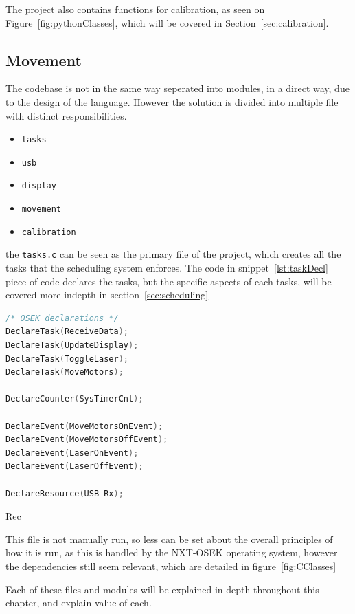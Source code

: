 The project also contains functions for calibration, as seen on Figure~\ref{fig:pythonClasses}, which will be covered in Section~\ref{sec:calibration}.


\subsection{Movement}
The codebase is not in the same way seperated into modules, in a direct way, due to the design of the language. However the solution is divided into multiple file with distinct responsibilities.

\begin{itemize}
	\item \texttt{tasks}
	\item \texttt{usb}
	\item \texttt{display}
	\item \texttt{movement}
	\item \texttt{calibration}
\end{itemize}

the \texttt{tasks.c} can be seen as the primary file of the project, which creates all the tasks that the scheduling system enforces.
The code in snippet~\ref{lst:taskDecl} piece of code declares the tasks, but the specific aspects of each tasks, will be covered more indepth in section~\ref{sec:scheduling}
\begin{lstlisting}[language={c},label={lst:taskDecl},caption={Declaration of tasks, counters and events}]
/* OSEK declarations */
DeclareTask(ReceiveData);
DeclareTask(UpdateDisplay);
DeclareTask(ToggleLaser);
DeclareTask(MoveMotors);

DeclareCounter(SysTimerCnt);

DeclareEvent(MoveMotorsOnEvent);
DeclareEvent(MoveMotorsOffEvent);
DeclareEvent(LaserOnEvent);
DeclareEvent(LaserOffEvent);

DeclareResource(USB_Rx);
\end{lstlisting}
Rec


This file is not manually run, so less can be set about the overall principles of how it is run, as this is handled by the NXT-OSEK operating system, however the dependencies still seem relevant, which are detailed in figure~\ref{fig:CClasses}


Each of these files and modules will be explained in-depth throughout this chapter, and explain value of each.

\
